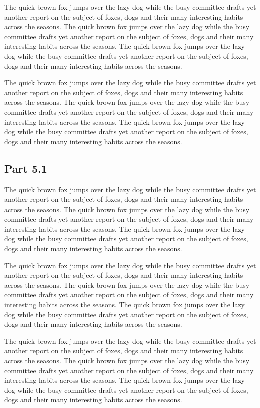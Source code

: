 \documentclass{article}
\begin{document}
The quick brown fox jumps over the lazy dog while the busy committee drafts yet another report on the subject of foxes, dogs and their many interesting habits across the seasons. The quick brown fox jumps over the lazy dog while the busy committee drafts yet another report on the subject of foxes, dogs and their many interesting habits across the seasons. The quick brown fox jumps over the lazy dog while the busy committee drafts yet another report on the subject of foxes, dogs and their many interesting habits across the seasons. 

The quick brown fox jumps over the lazy dog while the busy committee drafts yet another report on the subject of foxes, dogs and their many interesting habits across the seasons. The quick brown fox jumps over the lazy dog while the busy committee drafts yet another report on the subject of foxes, dogs and their many interesting habits across the seasons. The quick brown fox jumps over the lazy dog while the busy committee drafts yet another report on the subject of foxes, dogs and their many interesting habits across the seasons. 

\subsection{Part 5.1}
The quick brown fox jumps over the lazy dog while the busy committee drafts yet another report on the subject of foxes, dogs and their many interesting habits across the seasons. The quick brown fox jumps over the lazy dog while the busy committee drafts yet another report on the subject of foxes, dogs and their many interesting habits across the seasons. The quick brown fox jumps over the lazy dog while the busy committee drafts yet another report on the subject of foxes, dogs and their many interesting habits across the seasons. 

The quick brown fox jumps over the lazy dog while the busy committee drafts yet another report on the subject of foxes, dogs and their many interesting habits across the seasons. The quick brown fox jumps over the lazy dog while the busy committee drafts yet another report on the subject of foxes, dogs and their many interesting habits across the seasons. The quick brown fox jumps over the lazy dog while the busy committee drafts yet another report on the subject of foxes, dogs and their many interesting habits across the seasons. 

The quick brown fox jumps over the lazy dog while the busy committee drafts yet another report on the subject of foxes, dogs and their many interesting habits across the seasons. The quick brown fox jumps over the lazy dog while the busy committee drafts yet another report on the subject of foxes, dogs and their many interesting habits across the seasons. The quick brown fox jumps over the lazy dog while the busy committee drafts yet another report on the subject of foxes, dogs and their many interesting habits across the seasons. 
\end{document}
